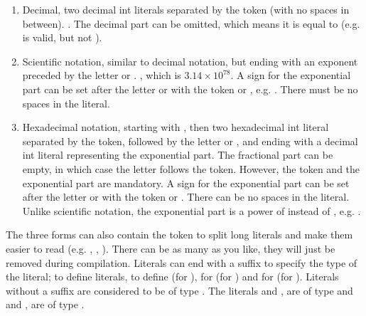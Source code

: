 \begin{enumerate}
\item Decimal, two decimal int literals separated by the token  (with
  no spaces in between). . The decimal part can be omitted,
  which means it is equal to  (e.g.  is valid, but not
  ).

\item Scientific notation, similar to decimal notation, but ending with an
  exponent preceded by the letter  or . , which is \(3.14
  \times 10^{78}\). A sign for the exponential part can be set after the letter
   or  with the token \token{-} or \token{+}, e.g.
  . There must be no spaces in the literal.

\item Hexadecimal notation, starting with , then two hexadecimal int
  literal separated by the  token, followed by the letter 
  or , and ending with a decimal int literal representing the
  exponential part. The fractional part can be empty, in which case the letter
   follows the  token. However, the  token and the
   exponential part are mandatory. A sign for the exponential part can
  be set after the letter  or  with the token \token{-} or
  \token{+}. There can be no spaces in the literal. Unlike scientific notation,
  the exponential part is a power of  instead of , e.g.
  .

\end{enumerate}

The three forms can also contain the token \token{\_} to split long literals
and make them easier to read (e.g. ,
, ). There can be as many
\token{\_} as you like, they will just be removed during compilation. Literals
can end with a suffix to specify the type of the literal;  to define
 literals,  to define  (for ),
 for  (for ) and  for
 (for ). Literals without a suffix are considered to
be of type . The literals  and ,
 are of type  and  and
,  are of type .

